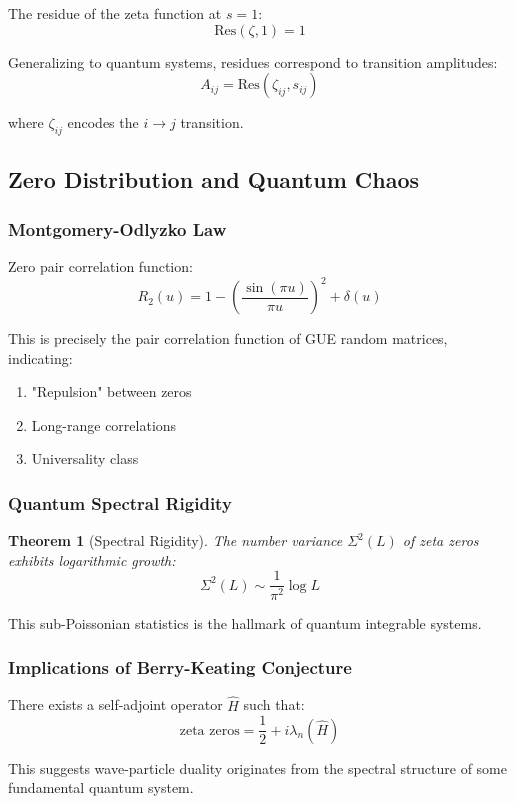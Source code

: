 \documentclass[11pt]{article}
\theoremstyle{plain}
\newtheorem{theorem}{Theorem}[section]
\theoremstyle{definition}
\theoremstyle{remark}
\begin{document}
The residue of the zeta function at $s = 1$:
$$\text{Res}(\zeta, 1) = 1$$

Generalizing to quantum systems, residues correspond to transition amplitudes:
$$A_{ij} = \text{Res}(\zeta_{ij}, s_{ij})$$

where $\zeta_{ij}$ encodes the $i \to j$ transition.

\subsection{Zero Distribution and Quantum Chaos}

\subsubsection{Montgomery-Odlyzko Law}

Zero pair correlation function:
$$R_2(u) = 1 - \left(\frac{\sin(\pi u)}{\pi u}\right)^2 + \delta(u)$$

This is precisely the pair correlation function of GUE random matrices, indicating:
\begin{enumerate}
\item "Repulsion" between zeros
\item Long-range correlations
\item Universality class
\end{enumerate}

\subsubsection{Quantum Spectral Rigidity}

\begin{theorem}[Spectral Rigidity]
The number variance $\Sigma^2(L)$ of zeta zeros exhibits logarithmic growth:
$$\Sigma^2(L) \sim \frac{1}{\pi^2} \log L$$
\end{theorem}

This sub-Poissonian statistics is the hallmark of quantum integrable systems.

\subsubsection{Implications of Berry-Keating Conjecture}

There exists a self-adjoint operator $\hat{H}$ such that:
$$\text{zeta zeros} = \frac{1}{2} + i \lambda_n(\hat{H})$$

This suggests wave-particle duality originates from the spectral structure of some fundamental quantum system.
\end{document}
